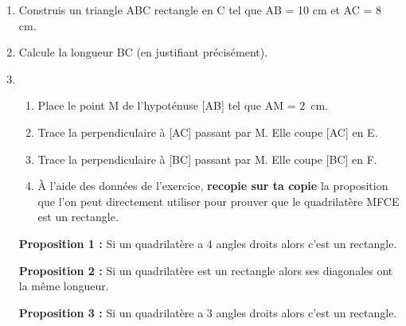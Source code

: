 
\medskip

\begin{enumerate}
\item Construis un triangle ABC rectangle en C tel que AB = 10 cm et AC = 8 cm. 
\item Calcule la longueur BC (en justifiant précisément). 
\item 
	\begin{enumerate}
		\item Place le point M de l'hypoténuse [AB] tel que AM = $2$~cm. 
		\item Trace la perpendiculaire à [AC] passant par M. Elle coupe [AC] en E. 
		\item Trace la perpendiculaire à [BC] passant par M. Elle coupe [BC] en F. 
		\item À l'aide des données de l'exercice, \textbf{recopie sur ta copie} la proposition que l'on peut directement utiliser pour prouver que le quadrilatère MFCE est un rectangle.
	\end{enumerate}

\medskip
	 
\textbf{Proposition 1 :} Si un quadrilatère a 4 angles droits alors c'est un rectangle. 

\textbf{Proposition 2 :} Si un quadrilatère est un rectangle alors ses diagonales ont la même longueur. 

\textbf{Proposition 3 :} Si un quadrilatère a 3 angles droits alors c'est un rectangle. 

\end{enumerate}

\bigskip

